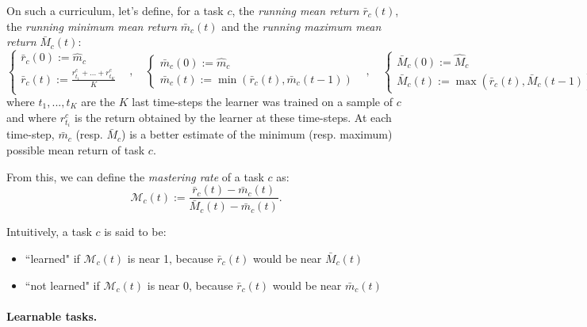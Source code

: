 \documentclass{article}
\begin{document}
On such a curriculum, let's define, for a task \(c\), the \textit{running  mean return} \(\bar{r}_c(t)\), the \textit{running minimum mean return} $\bar{m}_c(t)$ and the \textit{running maximum mean return} $\bar{M}_c(t)$:
$$\begin{cases}\bar{r}_c(0) := \hat{m}_{c} &  \\
\bar{r}_c(t) := \frac{r_{t_1}^c+...+r_{t_K}^c}{K}   \\
\end{cases}
,\quad
\begin{cases}
\bar{m}_c(0) := \hat{m}_c & \\
\bar{m}_c(t):=\min(\bar{r}_c(t), \bar{m}_c(t-1)) 
\end{cases}
,\quad
\begin{cases}
\bar{M}_c(0) := \hat{M}_c & \\
\bar{M}_c(t):=\max(\bar{r}_c(t), \bar{M}_c(t-1)) 
\end{cases}
$$
where \(t_{1}, ..., t_K\) are the \(K\) last time-steps the learner was trained on a sample of \(c\) and where \(r_{t_i}^c\) is the return obtained by the learner at these time-steps. At each time-step, \(\bar{m}_c\) (resp. \(\bar{M}_c\)) is a better estimate of the minimum (resp. maximum) possible mean return of task \(c\).

From this, we can define the \textit{mastering rate} of a task \(c\) as:
$$\mathcal{M}_c(t) :=\frac{\bar{r}_c(t) - \bar{m}_c(t)}{\bar{M}_c(t) - \bar{m}_c(t)}.$$

Intuitively, a task \(c\) is said to be:
\begin{itemize}
\item ``learned" if \(\mathcal{M}_c(t)\) is near 1, because \(\bar{r}_c(t)\) would be near \(\bar{M}_c(t)\)%
\item ``not learned" if  \(\mathcal{M}_c(t)\) is near 0, because \(\bar{r}_c(t)\) would be near \(\bar{m}_c(t)\)%
\end{itemize}

\paragraph{Learnable tasks.}
\end{document}
